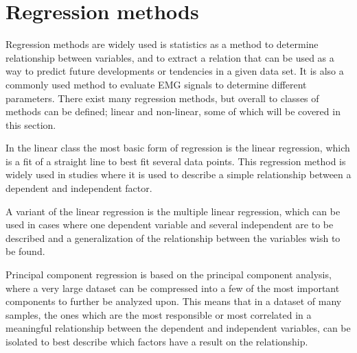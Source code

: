 \section{Regression methods}

	

Regression methods are widely used is statistics as a method to determine relationship between variables, and to extract a relation that can be used as a way to predict future developments or tendencies in a given data set. It is also a commonly used method to evaluate EMG signals to determine different parameters. There exist many regression methods, but overall to classes of methods can be defined; linear and non-linear, some of which will be covered in this section. 

In the linear class the most basic form of regression is the linear regression, which is a fit of a straight line to best fit several data points. This regression method is widely used in studies where it is used to describe a simple relationship between a dependent and independent factor.

A variant of the linear regression is the multiple linear regression, which can be used in cases where one dependent variable and several independent are to be described and a generalization of the relationship between the variables wish to be found. 

Principal component regression is based on the principal component analysis, where a very large dataset can be compressed into a few of the most important components to further be analyzed upon. This means that in a dataset of many samples, the ones which are the most responsible or most correlated in a meaningful relationship between the dependent and independent variables, can be isolated to best describe which factors have a result on the relationship.







